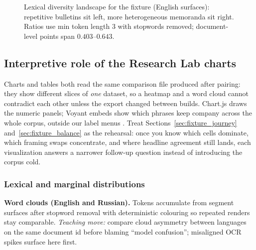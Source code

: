 \documentclass[11pt,a4paper]{article}
\theoremstyle{remark}
\begin{document}
\begin{figure}[htbp]
\centering
{}
\caption{Lexical diversity landscape for the fixture (English surfaces): repetitive bulletins sit left, more heterogeneous memoranda sit right. Ratios use min token length $3$ with stopwords removed; document-level points span $0.403$--$0.643$.}
\label{fig:ttr_axis}
\end{figure}

\subsection{Interpretive role of the Research Lab charts}
Charts and tables both read the same comparison file produced after pairing: they show different slices of \emph{one} dataset, so a heatmap and a word cloud cannot contradict each other unless the export changed between builds. Chart.js draws the numeric panels; Voyant embeds show which phrases keep company across the whole corpus, outside our label menus \citep{sinclair2016voyant}. Treat Sections~\ref{sec:fixture_journey} and~\ref{sec:fixture_balance} as the rehearsal: once you know which cells dominate, which framing swaps concentrate, and where headline agreement still lands, each visualization answers a narrower follow-up question instead of introducing the corpus cold.

\subsubsection{Lexical and marginal distributions}
\textbf{Word clouds (English and Russian).} Tokens accumulate from segment surfaces after stopword removal with deterministic colouring so repeated renders stay comparable. \textit{Teaching move:} compare cloud asymmetry between languages on the same document id before blaming ``model confusion''; misaligned OCR spikes surface here first.
\end{document}
